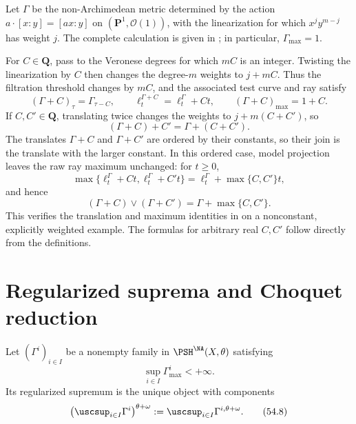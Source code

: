 \begin{example}
\label{ex:operations-p1-translation}
Let $\Gamma$ be the non-Archimedean metric determined by the action
$a\cdot[x:y]=[ax:y]$ on
$(\mathbf P^1,\mathcal O(1))$, with the linearization for which
$x^jy^{m-j}$ has weight $j$.  The complete calculation is given in
; in particular, $\Gamma_{\max}=1$.

For $C\in\mathbf Q$, pass to the Veronese degrees for which $mC$ is an
integer.  Twisting the linearization by $C$ then changes the degree-$m$
weights to $j+mC$.  Thus the filtration threshold changes by $mC$, and
the associated test curve and ray satisfy
\[
             (\Gamma+C)_\tau=\Gamma_{\tau-C},
             \qquad
             \ell_t^{\Gamma+C}=\ell_t^\Gamma+Ct,
             \qquad
             (\Gamma+C)_{\max}=1+C.
\]
If $C,C'\in\mathbf Q$, translating twice changes the weights to
$j+m(C+C')$, so
\[
                       (\Gamma+C)+C'=\Gamma+(C+C').
\]
The translates $\Gamma+C$ and $\Gamma+C'$ are ordered by their
constants, so their join is the translate with the larger constant.
In this ordered case, model projection leaves the raw ray maximum
unchanged: for $t\geq0$,
\[
 \max\{\ell_t^\Gamma+Ct,\ell_t^\Gamma+C't\}
       =\ell_t^\Gamma+\max\{C,C'\}t,
\]
and hence
\[
             (\Gamma+C)\vee(\Gamma+C')
                =\Gamma+\max\{C,C'\}.
\]
This verifies the translation and maximum identities in
 on a nonconstant, explicitly weighted
example.  The formulas for arbitrary real $C,C'$ follow directly from
the definitions.
\end{example}

\section{Regularized suprema and Choquet reduction}
\label{sec:operations-suprema}

\begin{definition}
\label{def:operations-supremum}
Let $(\Gamma^i)_{i\in I}$ be a nonempty family in
$\PSH^{\NA}(X,\theta)$ satisfying
\[
                   \sup_{i\in I}\Gamma^i_{\max}<+\infty.
\tag{54.7}\label{eq:operations-sup-bound}
\]
Its regularized supremum is the unique object with components
\[
 \left(\uscsup_{i\in I}\Gamma^i\right)^{\theta+\omega}
 :=\uscsup_{i\in I}\Gamma^{i,\theta+\omega}.
\tag{54.8}\label{eq:operations-supremum}
\]
\end{definition}


